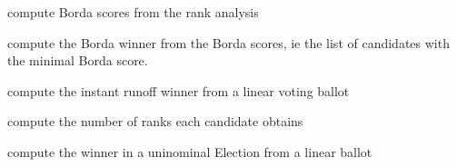 \documentclass[letterpaper,10pt,english]{sphinxmanual}
\begin{document}
\begin{fulllineitems}
\begin{fulllineitems}
\end{fulllineitems}


\begin{fulllineitems}
\label{techDoc:votingDigraphs.LinearVotingProfile.computeBordaScores}
compute Borda scores from the rank analysis

\end{fulllineitems}


\begin{fulllineitems}
\label{techDoc:votingDigraphs.LinearVotingProfile.computeBordaWinners}
compute the Borda winner from the Borda scores, ie the list of
candidates with the minimal Borda score.

\end{fulllineitems}


\begin{fulllineitems}
\label{techDoc:votingDigraphs.LinearVotingProfile.computeInstantRunoffWinner}
compute the instant runoff winner from a linear voting ballot

\end{fulllineitems}


\begin{fulllineitems}
\label{techDoc:votingDigraphs.LinearVotingProfile.computeRankAnalysis}
compute the number of ranks each candidate obtains

\end{fulllineitems}


\begin{fulllineitems}
\label{techDoc:votingDigraphs.LinearVotingProfile.computeSimpleMajorityWinner}
compute the winner in a uninominal Election from a linear ballot


\end{fulllineitems}
\end{fulllineitems}
\end{document}
